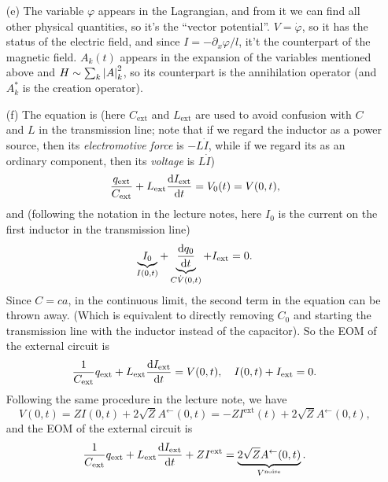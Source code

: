 \documentclass[hyperref, a4paper]{article}
\begin{document}
\begin{itemize}
\item[(e)] The variable $\varphi$ appears in the Lagrangian,
and from it we can find all other physical quantities,
so it's the ``vector potential''.
$V = \dot{\varphi}$, 
so it has the status of the electric field, 
and since $I = - \partial_x \varphi / l$,
it't the counterpart of the magnetic field.
$A_{k}(t)$ appears in the expansion of the variables mentioned above 
and $H \sim \sum_{k} \abs{A}_k^2$,
so its counterpart is the annihilation operator
(and $A^*_k$ is the creation operator).

\item[(f)] The equation is 
(here $C_{\text{ext}}$ and $L_{\text{ext}}$ are used to avoid confusion with $C$ and $L$ in the transmission line;
note that if we regard the inductor as a power source, 
then its \emph{electromotive force} is $- L \dot{I}$,
while if we regard its as an ordinary component,
then its \emph{voltage} is $L \dot{I}$)
\begin{equation}
    \frac{q_{\text{ext}}}{C_{\text{ext}}} + L_{\text{ext}} \dv{I_{\text{ext}}}{t} = V_0(t) = V(0, t),
\end{equation}
and (following the notation in the lecture notes,
here $I_0$ is the current on the first inductor in the transmission line)
\begin{equation}
    \underbrace{I_0}_{I(0, t)} + \underbrace{\dv{q_0}{t}}_{C \dot{V}(0, t)} + I_{\text{ext}} = 0.
\end{equation}
Since $C = ca$, in the continuous limit, the second term in the equation can be thrown away.
(Which is equivalent to directly removing $C_0$ and starting the transmission line with 
the inductor instead of the capacitor).
So the EOM of the external circuit is 
\begin{equation}
    \frac{1}{C_{\text{ext}}} q_{\text{ext}} + L_{\text{ext}} \dv{I_{\text{ext}}}{t} = V(0, t),
    \quad I(0, t) + I_{\text{ext}} = 0.
\end{equation}
Following the same procedure in the lecture note,
we have 
\begin{equation}
    V(0, t) = Z I(0, t) + 2 \sqrt{Z} A^{\leftarrow}(0, t)
    = - Z I^{\text{ext}}(t) + 2\sqrt{Z} A^{\leftarrow}(0, t),
    \label{eq:v-noise-decomposition}
\end{equation}
and the EOM of the external circuit is 
\begin{equation}
    \frac{1}{C_{\text{ext}}} q_{\text{ext}} + L_{\text{ext}} \dv{I_{\text{ext}}}{t} + Z I^{\text{ext}}
    = \underbrace{2 \sqrt{Z} A^{\leftarrow}(0, t)}_{V^{\text{noise}}}.

\end{equation}
\end{itemize}
\end{document}
